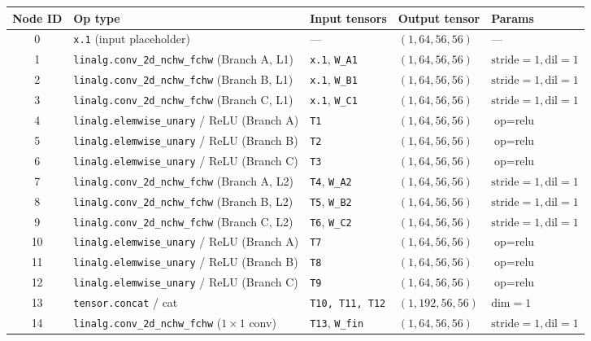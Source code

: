 \documentclass[11pt,a4paper]{article}
\begin{document}
\begin{table}[H]
\centering
\small
\begin{tabular}{cllll}
\toprule
\textbf{Node ID} & \textbf{Op type} & \textbf{Input tensors} & \textbf{Output tensor} & \textbf{Params} \\
\midrule
0  & \texttt{x.1} (input placeholder)               & ---            & $(1, 64, 56, 56)$  & --- \\
1  & \texttt{linalg.conv\_2d\_nchw\_fchw} (Branch A, L1) & \texttt{x.1}, \texttt{W\_A1} & $(1, 64, 56, 56)$  & $\text{stride}=1, \text{dil}=1$ \\
2  & \texttt{linalg.conv\_2d\_nchw\_fchw} (Branch B, L1) & \texttt{x.1}, \texttt{W\_B1} & $(1, 64, 56, 56)$  & $\text{stride}=1, \text{dil}=1$ \\
3  & \texttt{linalg.conv\_2d\_nchw\_fchw} (Branch C, L1) & \texttt{x.1}, \texttt{W\_C1} & $(1, 64, 56, 56)$  & $\text{stride}=1, \text{dil}=1$ \\
4  & \texttt{linalg.elemwise\_unary} / ReLU (Branch A)   & \texttt{T1}          & $(1, 64, 56, 56)$  & $\text{op}=\text{relu}$ \\
5  & \texttt{linalg.elemwise\_unary} / ReLU (Branch B)   & \texttt{T2}          & $(1, 64, 56, 56)$  & $\text{op}=\text{relu}$ \\
6  & \texttt{linalg.elemwise\_unary} / ReLU (Branch C)   & \texttt{T3}          & $(1, 64, 56, 56)$  & $\text{op}=\text{relu}$ \\
7  & \texttt{linalg.conv\_2d\_nchw\_fchw} (Branch A, L2) & \texttt{T4}, \texttt{W\_A2}  & $(1, 64, 56, 56)$  & $\text{stride}=1, \text{dil}=1$ \\
8  & \texttt{linalg.conv\_2d\_nchw\_fchw} (Branch B, L2) & \texttt{T5}, \texttt{W\_B2}  & $(1, 64, 56, 56)$  & $\text{stride}=1, \text{dil}=1$ \\
9  & \texttt{linalg.conv\_2d\_nchw\_fchw} (Branch C, L2) & \texttt{T6}, \texttt{W\_C2}  & $(1, 64, 56, 56)$  & $\text{stride}=1, \text{dil}=1$ \\
10 & \texttt{linalg.elemwise\_unary} / ReLU (Branch A)   & \texttt{T7}          & $(1, 64, 56, 56)$  & $\text{op}=\text{relu}$ \\
11 & \texttt{linalg.elemwise\_unary} / ReLU (Branch B)   & \texttt{T8}          & $(1, 64, 56, 56)$  & $\text{op}=\text{relu}$ \\
12 & \texttt{linalg.elemwise\_unary} / ReLU (Branch C)   & \texttt{T9}          & $(1, 64, 56, 56)$  & $\text{op}=\text{relu}$ \\
13 & \texttt{tensor.concat} / cat                        & \texttt{T10, T11, T12} & $(1, 192, 56, 56)$ & $\text{dim}=1$ \\
14 & \texttt{linalg.conv\_2d\_nchw\_fchw} ($1\times 1$ conv) & \texttt{T13}, \texttt{W\_fin} & $(1, 64, 56, 56)$  & $\text{stride}=1, \text{dil}=1$ \\
\bottomrule
\end{tabular}
\end{table}
\end{document}

